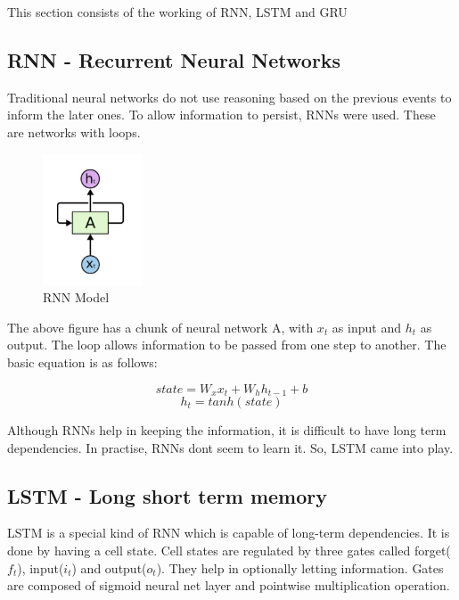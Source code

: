 \documentclass[runningheads]{llncs}
\begin{document}
This section consists of the working\cite{colah} of RNN, LSTM and GRU
 
\subsection{RNN - Recurrent Neural Networks}

Traditional neural networks do not use reasoning based on the previous events to inform the later ones. To allow information to persist, RNNs were used. These are networks with loops.

\begin{figure}[h!]
\centering
        \includegraphics[width=0.5\linewidth]{plots/working_rnn.png}
    \caption{RNN Model}
\end{figure}

The above figure has a chunk of neural network A, with $x_t$ as input and $h_t$ as output. The loop allows information to be passed from one step to another. The basic equation is as follows:

\[state = W_x x_t + W_h h_{t-1} + b \]
\[h_t = tanh(state) \]

Although RNNs help in keeping the information, it is difficult to have long term dependencies. In practise, RNNs dont seem to learn it. So, LSTM came into play.

\subsection{LSTM - Long short term memory}

LSTM is a special kind of RNN which is capable of long-term dependencies. It is done by having a cell state. Cell states are regulated by three gates called forget($f_t$), input($i_t$) and output($o_t$). They help in optionally letting information. Gates are composed of sigmoid neural net layer and pointwise multiplication operation.
\end{document}
